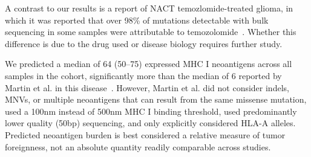 \documentclass[linenumbers]{bmcart}
\begin{document}







A contrast to our results is a report of NACT temozlomide-treated glioma, in which it was reported that over 98\% of mutations detectable with bulk sequencing in some samples were attributable to temozolomide~\cite{Johnson_2013}. Whether this difference is due to the drug used or disease biology requires further study.

We predicted a median of 64 (50--75) expressed MHC I neoantigens across all samples in the cohort, significantly more than the median of 6 reported by Martin et al. in this disease~\cite{Martin_2016}. However, Martin et al. did not consider indels, MNVs, or multiple neoantigens that can result from the same missense mutation, used a 100nm instead of 500nm MHC I binding threshold, used predominantly lower quality (50bp) sequencing, and only explicitly considered HLA-A alleles. Predicted neoantigen burden is best considered a relative measure of tumor foreignness, not an absolute quantity readily comparable across studies.
\end{document}
